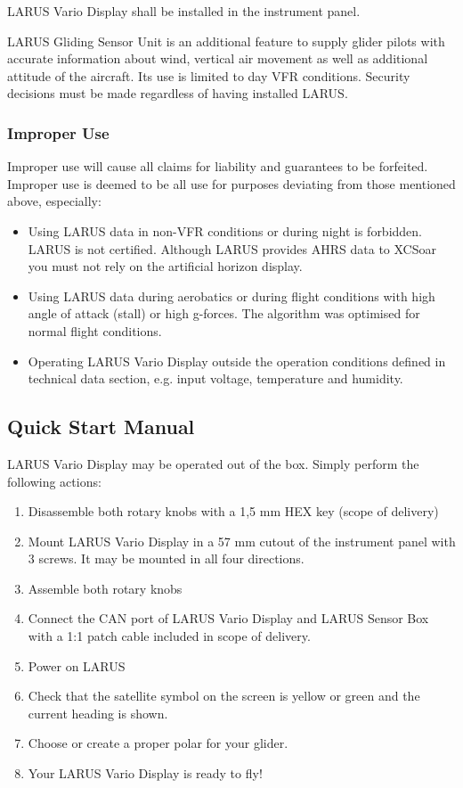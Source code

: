 LARUS Vario Display shall be installed in the instrument panel.

LARUS Gliding Sensor Unit is an additional feature to supply glider pilots with accurate information
about wind, vertical air movement as well as additional attitude of the aircraft. Its use is limited to
day VFR conditions. Security decisions must be made regardless of having installed LARUS.


\subsubsection{Improper Use}

Improper use will cause all claims for liability and guarantees to be forfeited. Improper use is deemed
to be all use for purposes deviating from those mentioned above, especially:
\begin{itemize}
	\item 	Using LARUS data in non-VFR conditions or during night is forbidden. LARUS is not certified.
			Although LARUS provides AHRS data to XCSoar you must not rely on the artificial horizon
			display.
	\item 	Using LARUS data during aerobatics or during flight conditions with high angle of attack (stall)
			or high g-forces. The algorithm was optimised for normal flight conditions.
	\item 	Operating LARUS Vario Display outside the operation conditions defined in technical data
			section, e.g. input voltage, temperature and humidity.
\end{itemize}


\subsection{Quick Start Manual}

LARUS Vario Display may be operated out of the box. Simply perform the following actions:
\begin{enumerate}
	\item 	Disassemble both rotary knobs with a 1,5 mm HEX key (scope of delivery)
	\item 	Mount LARUS Vario Display in a 57 mm cutout of the instrument panel with 3 screws. It may
			be mounted in all four directions.
	\item 	Assemble both rotary knobs
	\item 	Connect the CAN port of LARUS Vario Display and LARUS Sensor Box with a 1:1 patch cable
			included in scope of delivery.
	\item 	Power on LARUS
	\item 	Check that the satellite symbol on the screen is yellow or green and the current heading is
			shown.
	\item 	Choose or create a proper polar for your glider.
	\item 	Your LARUS Vario Display is ready to fly!	
\end{enumerate}
